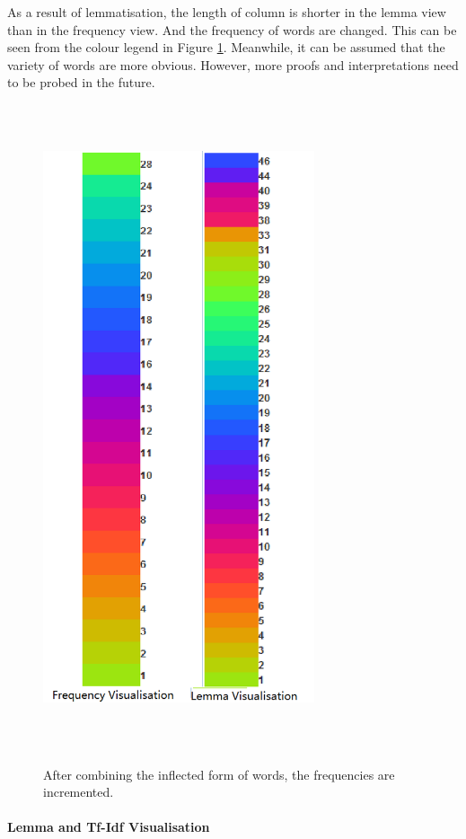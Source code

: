 As a result of lemmatisation, the length of column is shorter in the lemma view than in the frequency view. And the frequency of words are changed. This can be seen from the colour legend in Figure \ref{fig:freqLemmaComp}. Meanwhile, it can be assumed that the variety of words are more obvious. However, more proofs and interpretations need to be probed in the future.

\begin{figure}[H]
	\centering	
	\includegraphics[width=8cm, height=19cm]{Figs/Freq-Lemma-Comparison}\\[1ex]
	\caption{} After combining the inflected form of words, the frequencies are incremented.
	\label{fig:freqLemmaComp}
\end{figure} 

\paragraph{Lemma and Tf-Idf Visualisation}
